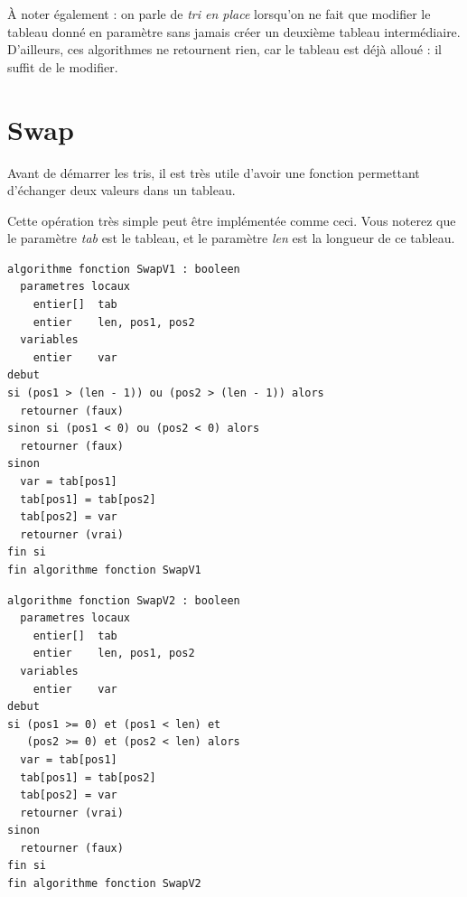 \documentclass[11pt,a4paper]{article}
\begin{document}
\bigskip

\`A noter également : on parle de \textit{tri en place} lorsqu'on ne fait que modifier le tableau donné en paramètre sans jamais créer un deuxième tableau intermédiaire.
D'ailleurs, ces algorithmes ne retournent rien, car le tableau est déjà alloué : il suffit de le modifier.


\clearpage


\section{Swap}

\medskip

Avant de démarrer les tris, il est très utile d'avoir une fonction permettant d'échanger deux valeurs dans un tableau.

Cette opération très simple peut être implémentée comme ceci.
Vous noterez que le paramètre \textit{tab} est le tableau, et le paramètre \textit{len} est la longueur de ce tableau.


\vfillFirst

\begin{table}[ht!]
  \centering
\begin{lstlisting}[style=algorithmique]
algorithme fonction SwapV1 : booleen
  parametres locaux
    entier[]  tab
    entier    len, pos1, pos2
  variables
    entier    var
debut
si (pos1 > (len - 1)) ou (pos2 > (len - 1)) alors
  retourner (faux)
sinon si (pos1 < 0) ou (pos2 < 0) alors
  retourner (faux)
sinon
  var = tab[pos1]
  tab[pos1] = tab[pos2]
  tab[pos2] = var
  retourner (vrai)
fin si
fin algorithme fonction SwapV1 \end{lstlisting}
\end{table}


\begin{table}[ht!]
  \centering
\begin{lstlisting}[style=algorithmique]
algorithme fonction SwapV2 : booleen
  parametres locaux
    entier[]  tab
    entier    len, pos1, pos2
  variables
    entier    var
debut
si (pos1 >= 0) et (pos1 < len) et
   (pos2 >= 0) et (pos2 < len) alors
  var = tab[pos1]
  tab[pos1] = tab[pos2]
  tab[pos2] = var
  retourner (vrai)
sinon
  retourner (faux)
fin si
fin algorithme fonction SwapV2 \end{lstlisting}
\end{table}
\end{document}
